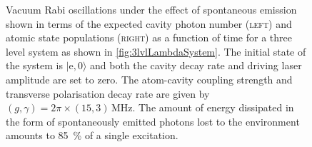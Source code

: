 \documentclass[../Thesis-IJspeert.tex]{subfiles}
\begin{document}
\begin{figure}[!t]
	\caption[Vacuum Rabi oscillations under the effect of spontaneous emission]{Vacuum Rabi oscillations under the effect of spontaneous emission shown in terms of the expected cavity photon number \textsc{(left)} and atomic state populations \textsc{(right)} as a function of time for a three level system as shown in \autoref{fig:3lvlLambdaSystem}. The initial state of the system is $\vert \mathrm{e}, 0 \rangle$ and both the cavity decay rate and driving laser amplitude are set to zero. The atom-cavity coupling strength and transverse polarisation decay rate are given by $(g,\gamma)=2\pi\times(15,3)\,\si{\mega\hertz}$. The amount of energy dissipated in the form of spontaneously emitted photons lost to the environment amounts to \SI{85}{\percent} of a single excitation.}
	\label{fig:VacuumRabiOscillations} 
\end{figure}
\end{document}
